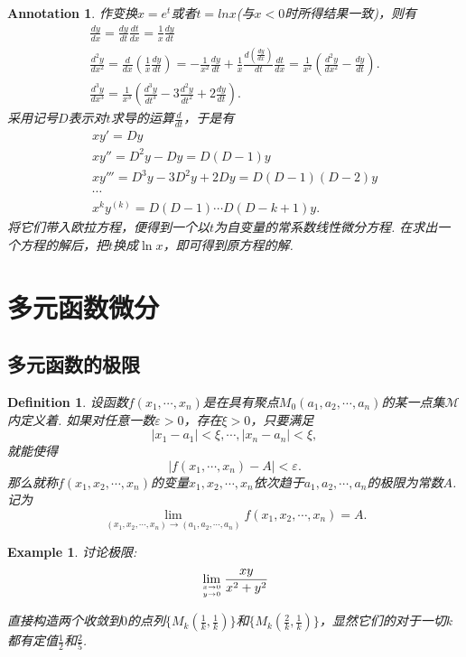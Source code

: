 \documentclass{article}
\newtheorem{example}[theorem]{Example}
\newtheorem{definition}[theorem]{Definition}
\newtheorem{annotation}[theorem]{Annotation}
\begin{document}
\begin{annotation}
\rm 作变换$x=e^t$或者$t = ln x$(与$x < 0$时所得结果一致)，则有
$$
\begin{array}{ll}
\frac{dy}{dx} = \frac{dy}{dt}\frac{dt}{dx} = \frac{1}{x} \frac{dy}{dt} \\
\frac{d^2y}{dx^2} = \frac{d}{dx}\left(\frac{1}{x}\frac{dy}{dt}\right) =  -\frac{1}{x^2} \frac{dy}{dt} + \frac{1}{x}\frac{d(\frac{dy}{dx})}{dt} \frac{dt}{dx} = \frac{1}{x^2}(\frac{d^2y}{dx^2}-\frac{dy}{dt}). \\
\frac{d^3y}{dx^3} = \frac{1}{x^3}(\frac{d^3y}{dt^3} - 3 \frac{d^2y}{dt^2} + 2\frac{dy}{dt}).
\end{array}
$$
采用记号$D$表示对$t$求导的运算$\frac{d}{dt}$，于是有
$$
\begin{array}{ll}
xy' = Dy \\
xy'' = D^2y - Dy = D(D-1)y \\
xy''' = D^3y - 3D^2y + 2Dy  = D(D-1)(D-2)y \\
\cdots \\
x^ky^{(k)} = D(D-1)\cdots D(D-k+1)y.
\end{array}
$$
将它们带入欧拉方程，便得到一个以$t$为自变量的常系数线性微分方程. 在求出一个方程的解后，把$t$换成$\ln x$，即可得到原方程的解. 
\end{annotation}


\newpage
\section{多元函数微分}

\subsection{多元函数的极限}

\begin{definition}
\rm 设函数$f(x_1,\cdots,x_n)$是在具有聚点$M_0(a_1,a_2,\cdots,a_n)$的某一点集$\mathcal{M}$内定义着. 如果对任意一数$\varepsilon > 0$，存在$\xi > 0$，只要满足
$$
|x_1 - a_1| < \xi,\cdots,|x_n - a_n| < \xi,
$$
就能使得
$$
|f(x_1,\cdots,x_n) - A| < \varepsilon. 
$$
那么就称$f(x_1,x_2,\cdots,x_n)$的变量$x_1,x_2,\cdots,x_n$依次趋于$a_1,a_2,\cdots,a_n$的极限为常数$A$. 记为
$$
\lim\limits_{(x_1,x_2,\cdots,x_n) \to (a_1,a_2,\cdots,a_n)}f(x_1,x_2,\cdots,x_n) = A.
$$
\end{definition}

\begin{example}
\rm 讨论极限:
$$
\lim\limits_{x \rightarrow 0 \atop y \rightarrow 0 } \frac{xy}{x^2+y^2}
$$

直接构造两个收敛到$0$的点列$\{M_k(\frac{1}{k}, \frac{1}{k})\}$和$\{M_k(\frac{2}{k}, \frac{1}{k})\}$，显然它们的对于一切$k$都有定值$\frac{1}{2}$和$\frac{2}{5}$.
\end{example}
\end{document}
